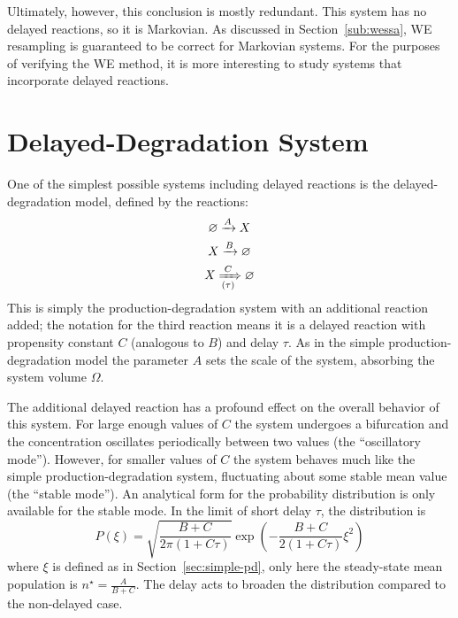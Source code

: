 \documentclass[english,letterpaper,12pt]{article}
\begin{document}
\begin{doublespacing}
Ultimately, however, this conclusion is mostly redundant. This system has no delayed reactions, so it is Markovian. As discussed in Section~\ref{sub:wessa}, WE resampling is guaranteed to be correct for Markovian systems. For the purposes of verifying the WE method, it is more interesting to study systems that incorporate delayed reactions.



\section{Delayed-Degradation System} %
\label{sec:delayed-deg}

One of the simplest possible systems including delayed reactions is the delayed-degradation model, defined by the reactions:
\begin{align}
    \begin{gathered}
        \varnothing \xrightarrow{A} X \\
        X \xrightarrow {B} \varnothing \\
        X \xRightarrow[(\tau)]{C} \varnothing
    \end{gathered}
    \label{eq:delayed-deg-rxns}
\end{align}
This is simply the production-degradation system with an additional reaction added; the notation for the third reaction means it is a delayed reaction with propensity constant $C$ (analogous to $B$) and delay $\tau$. As in the simple production-degradation model the parameter $A$ sets the scale of the system, absorbing the system volume $\Omega$.

The additional delayed reaction has a profound effect on the overall behavior of this system. For large enough values of $C$ the system undergoes a bifurcation and the concentration oscillates periodically between two values (the ``oscillatory mode''). However, for smaller values of $C$ the system behaves much like the simple production-degradation system, fluctuating about some stable mean value (the ``stable mode''). An analytical form for the probability distribution is only available for the stable mode. In the limit of short delay $\tau$, the distribution is 
\begin{equation}
    P(\xi) = \sqrt{\frac{B + C}{2\pi(1 + C\tau)}}\exp\left( -\frac{B + C}{2(1 + C\tau)} \xi^2 \right)
    \label{eq:dd-analytic-dist}
\end{equation}
where $\xi$ is defined as in Section~\ref{sec:simple-pd}, only here the steady-state mean population is $n^\star = \frac{A}{B + C}$. The delay acts to broaden the distribution compared to the non-delayed case.


\end{doublespacing}
\end{document}
